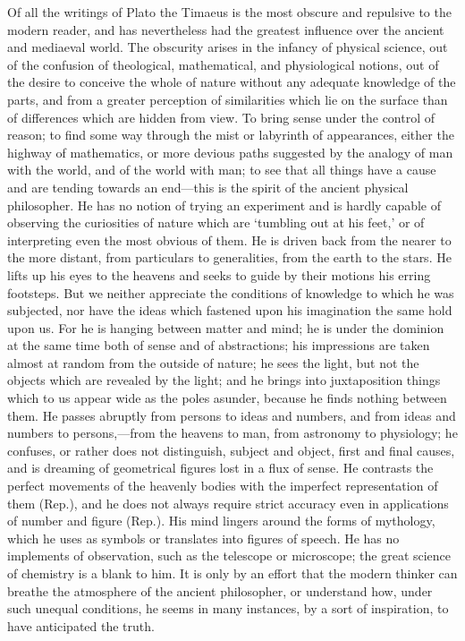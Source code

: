 
Of all the writings of Plato the Timaeus is the most obscure and repulsive
to the modern reader, and has nevertheless had the greatest influence over
the ancient and mediaeval world. The obscurity arises in the infancy of
physical science, out of the confusion of theological, mathematical, and
physiological notions, out of the desire to conceive the whole of nature
without any adequate knowledge of the parts, and from a greater perception
of similarities which lie on the surface than of differences which are
hidden from view. To bring sense under the control of reason; to find some
way through the mist or labyrinth of appearances, either the highway of
mathematics, or more devious paths suggested by the analogy of man with
the world, and of the world with man; to see that all things have a cause
and are tending towards an end—this is the spirit of the ancient
physical philosopher. He has no notion of trying an experiment and is
hardly capable of observing the curiosities of nature which are ‘tumbling
out at his feet,’ or of interpreting even the most obvious of them. He is
driven back from the nearer to the more distant, from particulars to
generalities, from the earth to the stars. He lifts up his eyes to the
heavens and seeks to guide by their motions his erring footsteps. But we
neither appreciate the conditions of knowledge to which he was subjected,
nor have the ideas which fastened upon his imagination the same hold upon
us. For he is hanging between matter and mind; he is under the dominion at
the same time both of sense and of abstractions; his impressions are taken
almost at random from the outside of nature; he sees the light, but not
the objects which are revealed by the light; and he brings into
juxtaposition things which to us appear wide as the poles asunder, because
he finds nothing between them. He passes abruptly from persons to ideas
and numbers, and from ideas and numbers to persons,—from the heavens
to man, from astronomy to physiology; he confuses, or rather does not
distinguish, subject and object, first and final causes, and is dreaming
of geometrical figures lost in a flux of sense. He contrasts the perfect
movements of the heavenly bodies with the imperfect representation of them
(Rep.), and he does not always require strict accuracy even in
applications of number and figure (Rep.). His mind lingers around the
forms of mythology, which he uses as symbols or translates into figures of
speech. He has no implements of observation, such as the telescope or
microscope; the great science of chemistry is a blank to him. It is only
by an effort that the modern thinker can breathe the atmosphere of the
ancient philosopher, or understand how, under such unequal conditions, he
seems in many instances, by a sort of inspiration, to have anticipated the
truth.

